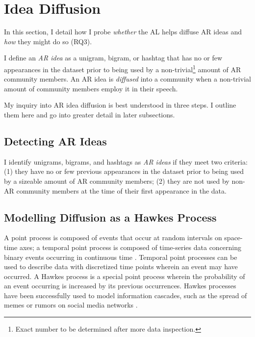 \documentclass[acmlarge, screen, authorversion]{acmart}
\begin{document}
\section{Idea Diffusion}

In this section, I detail how I probe \textit{whether} the AL helps diffuse AR ideas and \textit{how} they might do so (RQ3). 

I define an \textit{AR idea} as a unigram, bigram, or hashtag that has no or few appearances in the dataset prior to being used by a non-trivial\footnote{Exact number to be determined after more data inspection.} amount of AR community members. An AR idea is \textit{diffused} into a community when a non-trivial amount of community members employ it in their speech.

My inquiry into AR idea diffusion is best understood in three steps. I outline them here and go into greater detail in later subsections.

\subsection{Detecting AR Ideas}

I identify unigrams, bigrams, and hashtags as \textit{AR ideas} if they meet two criteria: (1) they have no or few previous appearances in the dataset prior to being used by a sizeable amount of AR community members; (2) they are not used by non-AR community members at the time of their first appearance in the data.

\subsection{Modelling Diffusion as a Hawkes Process}

A point process is composed of events that occur at random intervals on space-time axes; a temporal point process is composed of time-series data concerning binary events occurring in continuous time \cite{daleyIntroductionTheoryPoint2003, ogataSpaceTimePointProcessModels1998}. Temporal point processes can be used to describe data with discretized time points wherein an event may have occurred. A Hawkes process is a special point process wherein the probability of an event occurring is increased by its previous occurrences. Hawkes processes have been successfully used to model information cascades, such as the spread of memes or rumors on social media networks \cite{luoMultiTaskMultiDimensionalHawkes2015,lukasikHawkesProcessesContinuous2016}.
\end{document}
